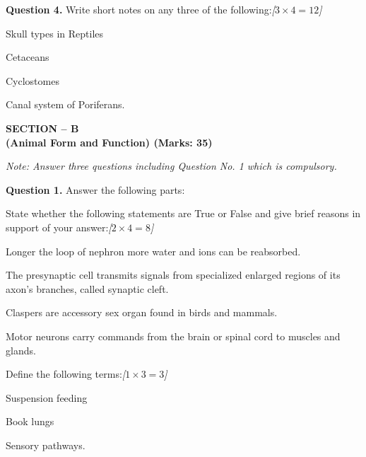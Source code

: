 \documentclass[11pt,a4paper]{article}
\newcommand{\pts}[1]{\hfill   \textit{[#1]}}
\begin{document}
\medskip


\noindent   \textbf{Question 4.} Write short notes on any three of the following:\pts{$3  \times 4 = 12$}

\begin{parts}
  \item Skull types in Reptiles
  \item Cetaceans
  \item Cyclostomes
  \item Canal system of Poriferans.
\end{parts}

\pagebreak

\begin{center}
   \textbf{SECTION -- B} \\
   \textbf{(Animal Form and Function) (Marks: 35)}
\end{center}

\smallskip



\noindent   \textit{Note: Answer three questions including Question No. 1 which is compulsory.}

\medskip


\noindent   \textbf{Question 1.} Answer the following parts:

\begin{parts}
  \item State whether the following statements are True or False and give brief reasons in support of your answer:\pts{$2  \times 4 = 8$}
  
\begin{parts}
    \item Longer the loop of nephron more water and ions can be reabsorbed.
    \item The presynaptic cell transmits signals from specialized enlarged regions of its axon's branches, called synaptic cleft.
    \item Claspers are accessory sex organ found in birds and mammals.
    \item Motor neurons carry commands from the brain or spinal cord to muscles and glands.
  \end{parts}

  \item Define the following terms:\pts{$1  \times 3 = 3$}
  
\begin{parts}
    \item Suspension feeding
    \item Book lungs
    \item Sensory pathways.
  \end{parts}
\end{parts}
\end{document}
